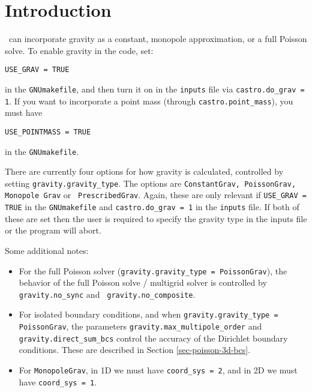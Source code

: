 \section{Introduction}

\castro\ can incorporate gravity as a constant, monopole approximation,
or a full Poisson solve.  To enable gravity in the code, set:
\begin{verbatim}
USE_GRAV = TRUE
\end{verbatim}
in the {\tt GNUmakefile}, and then turn it on in the {\tt inputs} file
via {\tt castro.do\_grav = 1}.  If you want to incorporate a point mass
(through {\tt castro.point\_mass}), you must have
\begin{verbatim}
USE_POINTMASS = TRUE
\end{verbatim}
in the {\tt GNUmakefile}.

There are currently four options for how gravity is calculated,
controlled by setting {\tt gravity.gravity\_type}.  The options are
{\tt ConstantGrav, PoissonGrav, Monopole Grav} or {\tt
  PrescribedGrav}.  Again, these are only relevant if {\tt USE\_GRAV =
  TRUE} in the {\tt GNUmakefile} and {\tt castro.do\_grav = 1} in the
{\tt inputs} file.  If both of these are set then the user is required
to specify the gravity type in the inputs file or the program will
abort.

Some additional notes:
\begin{itemize}

\item For the full Poisson solver ({\tt gravity.gravity\_type =
  PoissonGrav}), the behavior of the full Poisson solve / multigrid
solver is controlled by {\tt gravity.no\_sync} and {\tt
  gravity.no\_composite}.

\item For isolated boundary conditions, and when {\tt gravity.gravity\_type
  = PoissonGrav}, the parameters {\tt gravity.max\_multipole\_order}
and {\tt gravity.direct\_sum\_bcs} control the accuracy of the
Dirichlet boundary conditions.  These are described in Section
\ref{sec-poisson-3d-bcs}.

\item For {\tt MonopoleGrav}, in 1D we must have {\tt coord\_sys = 2}, and in
  2D we must have {\tt coord\_sys = 1}.
\end{itemize}

